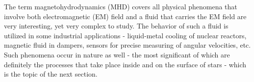 The term magnetohydrodynamics (MHD) covers all physical phenomena that involve both electromagnetic (EM) field and a fluid that carries the EM field are very interesting, yet very complex to study. The behavior of such a fluid is utilized in some industrial applications - liquid-metal cooling of nuclear reactors, magnetic fluid in dampers, sensors for precise measuring of angular velocities, etc. Such phenomena occur in nature as well - the most significant of which are definitely the processes that take place inside and on the surface of stars - which is the topic of the next section.